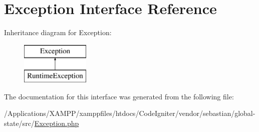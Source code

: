 \hypertarget{interface_sebastian_bergmann_1_1_global_state_1_1_exception}{}\section{Exception Interface Reference}
\label{interface_sebastian_bergmann_1_1_global_state_1_1_exception}
Inheritance diagram for Exception\+:\begin{figure}[H]
\begin{center}
\leavevmode
\includegraphics[height=2.000000cm]{interface_sebastian_bergmann_1_1_global_state_1_1_exception}
\end{center}
\end{figure}


The documentation for this interface was generated from the following file\+:\begin{DoxyCompactItemize}
\item 
/\+Applications/\+X\+A\+M\+P\+P/xamppfiles/htdocs/\+Code\+Igniter/vendor/sebastian/global-\/state/src/\mbox{\hyperlink{sebastian_2global-state_2src_2_exception_8php}{Exception.\+php}}\end{DoxyCompactItemize}
